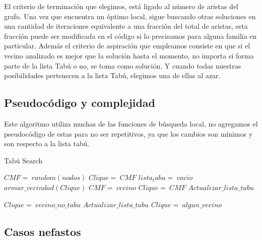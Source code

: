 El criterio de terminación que elegimos, está ligado al número de aristas del grafo. Una vez que encuentra un óptimo local, sigue buscando otras soluciones en una cantidad de iteraciones equivalente a una fracción del total de aristas, esta fracción puede ser modificada en el código si lo precisamos para alguna familia en particular.
Además el criterio de aspiración que empleamos consiste en que si el vecino analizado es mejor que la solución hasta el momento, no importa si forma parte de la lista Tabú o no, se toma como solución. Y cuando todas nuestras posibilidades pertenecen a la lista Tabú, elegimos una de ellas al azar.

\subsection{Pseudoc\'odigo y complejidad}
Este algoritmo utiliza muchas de las funciones de búsqueda local, no agregamos el pseudocódigo de estas para no ser repetitivos, ya que los cambios son mínimos y son respecto a la lista tabú.

\begin{algorithm}
	\caption{Tabú Search}\label{tabu}
	\begin{algorithmic}[1]
		\State $CMF=\ random(nodos)$	
		\State $Clique=\ CMF$
		\State $lista_tabu=\ vacio$
			\State $armar\_vecindad(Clique)$
				 
					\State $CMF=\ vecino$
					\State $Clique=\ CMF$ 
					\State $Actualizar\_lista\_tabu$
				\EndIf
			\EndFor
		\EndWhile

				\State $Clique=\ vecino\_no\_tabu$
				\State $Actualizar\_lista\_tabu$
			\Else
				\State $Clique=\ algun\_vecino$
			\EndIf
		\EndIf
	\EndProcedure
\end{algorithmic}
\end{algorithm}


\subsection{Casos nefastos}






